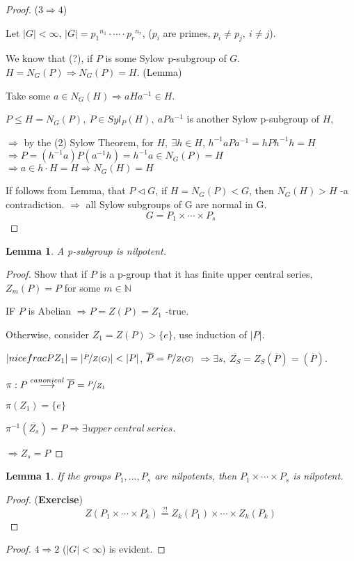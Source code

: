 \documentclass[12pt, a4paper]{article}
\newcounter{lemmacounter}
\newtheorem{lemma}[lemmacounter]{Lemma}
\theoremstyle{definition}
\begin{document}
\begin{proof}
    ($3\Rightarrow 4$) \par
    Let $|G|<\infty $, $|G|={p_1}^{n_1}\cdot \cdots \cdot {p_r}^{n_r} $, ($p_i$ are primes,
    $p_i\neq p_j,\ i\neq j$).
    \par
    We know that (?), if $P$ is some Sylow p-subgroup of $G$. $H=N_G(P) \Rightarrow N_G(P)
    =H$. (Lemma)
    \par
    Take some $a\in N_G(H) \Rightarrow aHa^{-1}\in H$.
    \par
    $P \leqslant H = N_G(P),\ P\in Syl_P(H),\ aPa^{-1}$ is another Sylow p-subgroup of $H$,
    \par
    $\Rightarrow $ by the (2) Sylow Theorem, for $H,\ \exists h\in H$, 
    $h^{-1}aPa^{-1} = hPh^{-1}h=H $ $\Rightarrow P = (h^{-1}a)P(a^{-1}h) = 
    h^{-1}a\in N_G(P) =H $ $\Rightarrow a\in h\cdot H = H \Rightarrow N_G(H) = H $
    \par
    If follows from Lemma, that $P\lhd G $, if $H = N_G(P) <G$, then $N_G(H)>H $ -a 
    contradiction. $\Rightarrow $ all Sylow subgroups of G are normal in G.
    \[G=P_1 \times \cdots \times P_s\]
\end{proof}
\begin{lemma}
    A p-subgroup is nilpotent.
\end{lemma}
\begin{proof}
    Show that if $P$ is a p-group that it has finite upper central series, $Z_m(P) =P$ 
    for some $m\in \mathbb{N} $
    \par
    IF $P$ is Abelian $\Rightarrow P = Z(P) =Z_1$ -true.
    \par
    Otherwise, consider $Z_1 = Z(P)>\{e\}$, use induction of $|P|$.
    \par
    $|nicefrac{P}{Z_1}| =|\nicefrac{P}{Z(G)} |<|P| $, $\overline{P} = \nicefrac{P}{Z(G)} $
    $\Rightarrow \exists s,\ \overline{Z_S}=Z_S(\overline{P}) = (\overline{P}) $.\par
    $\pi: P \stackrel{canonical}{\longrightarrow} \overline{P} = \nicefrac{P}{Z_1}$\par
    $\pi (Z_1) = \{e\} $\par
    $\pi^{-1} (\overline{Z_s}) = P\Rightarrow \exists upper\ central\ series$.\par
    $\Rightarrow Z_s = P $
    \par
\end{proof}
\begin{lemma}
    If the groups $P_1,\ldots ,P_s $ are nilpotents, then $P_1 \times \cdots \times P_s $ is
    nilpotent.
\end{lemma}
\begin{proof}
    (\textbf{Exercise}) 
    \[ Z(P_1 \times \cdots \times P_k)\stackrel{?!}{=}Z_k(P_1)\times \cdots \times Z_k(P_k)\]
\end{proof}
\begin{proof}
        $4\Rightarrow 2 $ ($|G|<\infty $) is evident.
\end{proof}
\newpage
\end{document}
